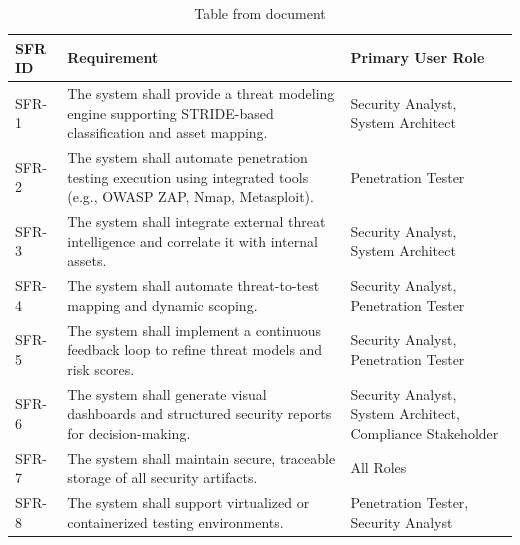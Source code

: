 \documentclass[12pt,a4paper]{report}
\begin{document}
\begin{table}[H]
\centering
\small
\begin{tabularx}{\textwidth}{|l|l|l|}
\hline
SFR ID & Requirement & Primary User Role \\
\hline\hline
SFR-1 & The system shall provide a threat modeling engine supporting STRIDE-based classification and asset mapping. & Security Analyst, System Architect \\
\hline
SFR-2 & The system shall automate penetration testing execution using integrated tools (e.g., OWASP ZAP, Nmap, Metasploit). & Penetration Tester \\
\hline
SFR-3 & The system shall integrate external threat intelligence and correlate it with internal assets. & Security Analyst, System Architect \\
\hline
SFR-4 & The system shall automate threat-to-test mapping and dynamic scoping. & Security Analyst, Penetration Tester \\
\hline
SFR-5 & The system shall implement a continuous feedback loop to refine threat models and risk scores. & Security Analyst, Penetration Tester \\
\hline
SFR-6 & The system shall generate visual dashboards and structured security reports for decision-making. & Security Analyst, System Architect, Compliance Stakeholder \\
\hline
SFR-7 & The system shall maintain secure, traceable storage of all security artifacts. & All Roles \\
\hline
SFR-8 & The system shall support virtualized or containerized testing environments. & Penetration Tester, Security Analyst \\
\hline
\end{tabularx}
\caption{Table from document}
\end{table}
\end{document}
